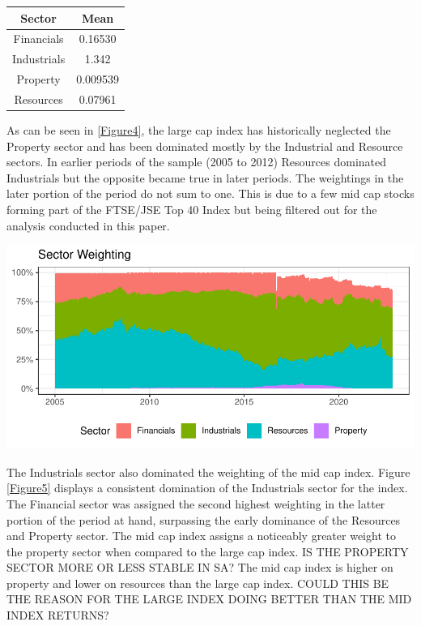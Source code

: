 \documentclass[11pt,preprint, authoryear]{elsarticle}
\let\origfigure\figure
\let\endorigfigure\endfigure
\renewenvironment{figure}[1][2] {
    \expandafter\origfigure\expandafter[H]
} {
    \endorigfigure
}
\let\origtable\table
\let\endorigtable\endtable
\renewenvironment{table}[1][2] {
    \expandafter\origtable\expandafter[H]
} {
    \endorigtable
}
\numberwithin{equation}{section}
\numberwithin{figure}{section}
\numberwithin{table}{section}
\begin{document}
\begin{table}[h]
\begin{center}
    \begin{tabular}{| c | c |}
    \hline
        Sector & Mean \\
        \hline
        Financials & 0.16530 \\
        Industrials & 1.342 \\
        Property & 0.009539 \\
        Resources & 0.07961 \\
        \hline
    \end{tabular}
    \caption{Mean daily returns}
    \label{tab:Mean}
\end{center}
\end{table}

As can be seen in \ref{Figure4}, the large cap index has historically
neglected the Property sector and has been dominated mostly by the
Industrial and Resource sectors. In earlier periods of the sample (2005
to 2012) Resources dominated Industrials but the opposite became true in
later periods. The weightings in the later portion of the period do not
sum to one. This is due to a few mid cap stocks forming part of the
FTSE/JSE Top 40 Index but being filtered out for the analysis conducted
in this paper.

\begin{figure}[H]

{\centering \includegraphics{Volatility-of-Shares_files/figure-latex/Figure4-1} 

}

\caption{Sector weights for Large Cap index \label{Figure4}}\label{fig:Figure4}
\end{figure}

The Industrials sector also dominated the weighting of the mid cap
index. Figure \ref{Figure5} displays a consistent domination of the
Industrials sector for the index. The Financial sector was assigned the
second highest weighting in the latter portion of the period at hand,
surpassing the early dominance of the Resources and Property sector. The
mid cap index assigns a noticeably greater weight to the property sector
when compared to the large cap index. IS THE PROPERTY SECTOR MORE OR
LESS STABLE IN SA? The mid cap index is higher on property and lower on
resources than the large cap index. COULD THIS BE THE REASON FOR THE
LARGE INDEX DOING BETTER THAN THE MID INDEX RETURNS?
\end{document}
